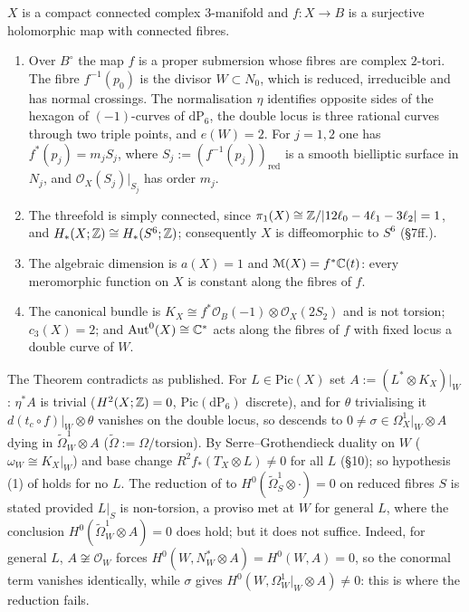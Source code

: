 \begin{theorem}
$X$ is a compact connected complex $3$-manifold and $f \colon X \to B$ is a surjective holomorphic map with connected fibres.
\begin{enumerate}[label=(\arabic*)]
\item Over $B^\circ$ the map $f$ is a proper submersion whose fibres are complex $2$-tori. The fibre $f^{-1}(p_0)$ is the divisor $W \subset N_0$, which is reduced, irreducible and has normal crossings. The normalisation $\eta$ identifies opposite sides of the hexagon of $(-1)$-curves of $\mathrm{dP}_6$, the double locus is three rational curves through two triple points, and $e(W) = 2$. For $j=1,2$ one has $f^*(p_j) = m_j S_j$, where $S_j := (f^{-1}(p_j))_{\mathrm{red}}$ is a smooth bielliptic surface in $N_j$, and $\mathcal O_X(S_j)|_{S_j}$ has order $m_j$.
\item The threefold is simply connected, since $\pi_1(X) \cong \mathbb{Z}/|12\ell_0 - 4\ell_1 - 3\ell_2| = 1$, and $H_*(X;\mathbb{Z}) \cong H_*(S^6;\mathbb{Z})$; consequently $X$ is diffeomorphic to $S^6$ (\S7ff.).
\item The algebraic dimension is $a(X) = 1$ and $\mathcal M(X) = f^*\mathbb{C}(t)$: every meromorphic function on $X$ is constant along the fibres of $f$.
\item The canonical bundle is $K_X \cong f^*\mathcal O_B(-1) \otimes \mathcal O_X(2S_2)$ and is not torsion; $c_3(X) = 2$; and $\mathrm{Aut}^0(X) \cong \mathbb{C}^*$ acts along the fibres of $f$ with fixed locus a double curve of $W$.
\end{enumerate}
\end{theorem}

\begin{remark}
The Theorem contradicts \cite[Cor.\ 2.3]{CDP20} as published. For $L \in \mathrm{Pic}(X)$ set $A := (L^* \otimes K_X)|_W$: $\eta^*A$ is trivial ($H^2(X;\mathbb{Z})=0$, $\mathrm{Pic}(\mathrm{dP}_6)$ discrete), and for $\theta$ trivialising it $d(t_c \circ f)|_W \otimes \theta$ vanishes on the double locus, so descends to $0 \ne \sigma \in \Omega^1_X|_W \otimes A$ dying in $\widetilde\Omega^1_W \otimes A$ ($\widetilde\Omega := \Omega/\mathrm{torsion}$). By Serre--Grothendieck duality on $W$ ($\omega_W \cong K_X|_W$) and base change $R^2 f_*(T_X \otimes L) \ne 0$ for all $L$ (\S10); so hypothesis (1) of \cite[Prop.\ 2.4, p.\ 680]{CDP20} holds for no $L$. The reduction of \cite[p.\ 692]{CDP20} to $H^0(\widetilde\Omega^1_S \otimes \cdot) = 0$ on reduced fibres $S$ is stated provided $L|_S$ is non-torsion, a proviso met at $W$ for general $L$, where the conclusion $H^0(\widetilde\Omega^1_W \otimes A) = 0$ does hold; but it does not suffice. Indeed, for general $L$, $A \not\cong \mathcal O_W$ forces $H^0(W, N_W^* \otimes A) = H^0(W,A) = 0$, so the conormal term vanishes identically, while $\sigma$ gives $H^0(W, \Omega^1_W|_W \otimes A) \ne 0$: this is where the reduction fails.
\end{remark}

\newpage
